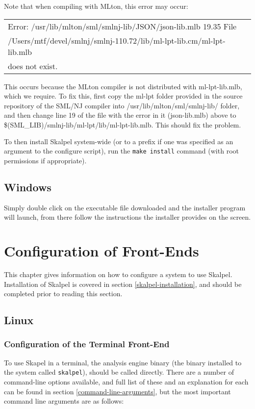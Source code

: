 \documentclass{report}
\begin{document}
Note that when compiling with MLton, this error may occur:

\begin{tabular}{l}
\noindent Error: /usr/lib/mlton/sml/smlnj-lib/JSON/json-lib.mlb 19.35 File\\
/Users/mtf/devel/smlnj/smlnj-110.72/lib/ml-lpt-lib.cm/ml-lpt-lib.mlb\\
does not exist.
\end{tabular}

This occurs because the MLton compiler is not distributed with
ml-lpt-lib.mlb, which we require. To fix this, first copy the ml-lpt
folder provided in the source repository of the SML/NJ compiler into
/usr/lib/mlton/sml/smlnj-lib/ folder, and then change line 19 of the
file with the error in it (json-lib.mlb) above to
\$(SML\_LIB)/smlnj-lib/ml-lpt/lib/ml-lpt-lib.mlb. This should fix the
problem.


To then install Skalpel system-wide (or to a prefix if one was specified as
an argument to the configure script), run the \texttt{make install}
command (with root permissions if appropriate).

\section{Windows}

Simply double click on the executable file downloaded and the
installer program will launch, from there follow the instructions the
installer provides on the screen.

\chapter{Configuration of Front-Ends}

This chapter gives information on how to configure a system to use
Skalpel. Installation of Skalpel is covered in section
\ref{skalpel-installation}, and should be completed prior to reading
this section.

\section{Linux}

\subsection{Configuration of the Terminal Front-End}
\label{skalpel-environment-vars}

To use Skapel in a terminal, the analysis engine binary (the binary
installed to the system called \texttt{skalpel}), should be called
directly. There are a number of command-line options available, and
full list of these and an explanation for each can be found in section
\ref{command-line-arguments}, but the most important command line
arguments are as follows:
\end{document}
